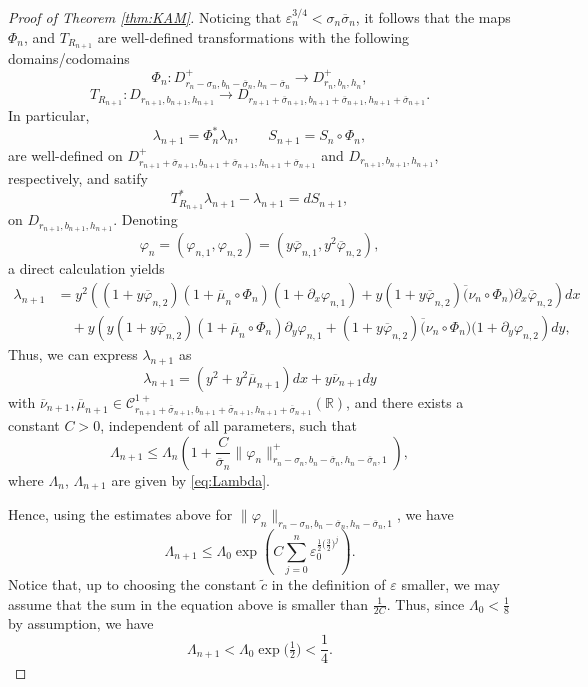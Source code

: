\documentclass[10pt,a4paper]{amsart}
\newcommand{\Domain}[3]{D_{#1, #2, #3}}
\newcommand{\DomainP}[3]{D_{#1, #2, #3}^+}
\newcommand{\R}{\mathbb{R}}
\newcommand{\T}{\mathbb{T}}
\begin{document}
\begin{proof}[Proof of Theorem \ref{thm:KAM}]
Noticing that $\varepsilon_n^{3/4} < \sigma_n \overline \sigma_n$, it follows that the maps $\Phi_n$, and $T_{R_{n + 1}}$ are well-defined transformations with the following domains/codomains
\[ 
\Phi_n: \DomainP{r_n - \sigma_n}{b_n - \overline \sigma_n}{h_n - \overline \sigma_n} \to  \DomainP{r_n}{b_n}{h_n},\]
\[T_{R_{n + 1}}: \Domain{r_{n + 1}}{b_{n + 1}}{h_{n + 1}} \to \Domain{r_{n + 1} + \overline \sigma_{n + 1}}{b_{n + 1} + \overline \sigma_{n + 1}}{h_{n + 1} + \overline \sigma_{n + 1}}.
\]
In particular, 
\[\lambda_{n + 1}= \Phi_n^* \lambda_n,\qquad S_{n + 1}= S_n \circ \Phi_n,\] are well-defined on $\DomainP{r_{n + 1} + \overline \sigma_{n + 1}}{b_{n + 1} + \overline \sigma_{n + 1}}{h_{n + 1} + \overline \sigma_{n + 1}}$ and $\Domain{r_{n + 1}}{b_{n + 1}}{h_{n + 1}}$, respectively, and satify
\[ T_{R_{n + 1}}^* \lambda_{n + 1} - \lambda_{n + 1} = dS_{n + 1}, \]
on $\Domain{r_{n + 1}}{b_{n + 1}}{h_{n + 1}}$. Denoting 
\[\varphi_n =  (\varphi_{n , 1}, \varphi_{n, 2}) = (y \overline \varphi_{n , 1}, y^2 \overline \varphi_{n, 2}),\]
a direct calculation yields
\begin{align*}
    \lambda_{n + 1} & = y^2\left( (1 + y \overline \varphi_{n, 2})(1 + \overline \mu_n \circ \Phi_n)(1 + \partial_x \varphi_{n, 1}) + y(1 + y \overline \varphi_{n, 2})\overline (\nu_n \circ \Phi_n) \partial_x \overline \varphi_{n, 2}\right)dx \\
    & \quad +y\left(y(1 + y \overline \varphi_{n, 2})(1 + \overline \mu_n \circ \Phi_n)\partial_y \varphi_{n, 1} + (1 + y \overline \varphi_{n, 2})\overline (\nu_n \circ \Phi_n) (1 + \partial_y \varphi_{n, 2}\right)dy,
\end{align*}
Thus, we can express $\lambda_{n + 1}$ as 
\[ \lambda_{n + 1} = (y^2 + y^2 \overline \mu_{n + 1}) dx + y \overline \nu_{n + 1} dy\]
with $\overline \nu_{n + 1}, \overline \mu_{n + 1} \in  \mathscr C^{1+}_{r_{n + 1} + \overline \sigma_{n + 1},b_{n + 1} + \overline \sigma_{n + 1},h_{n + 1} + \overline \sigma_{n + 1}}(\R)$, and there exists a constant $C > 0$, independent of all parameters, such that
\[ \Lambda_{n + 1} \leq \Lambda_n\left(1 + \frac{C}{\overline \sigma_n}\|\varphi_{n}\|^+_{r_{n}-\sigma_n,b_{n}-\overline\sigma_n,h_{n}-\overline\sigma_n,1}\right),  \]
where $\Lambda_n$, $\Lambda_{n + 1}$ are given by \eqref{eq:Lambda}. 

Hence, using the estimates above for $\|\varphi_{n}\|_{r_{n}-\sigma_n,b_{n}-\overline\sigma_n,h_{n}-\overline\sigma_n,1}$, we have
\[ \Lambda_{n + 1} \leq \Lambda_0 \exp\left(C \sum_{j = 0}^n \varepsilon_0^{\tfrac{1}{2}\big(\tfrac{3}{2}\big)^j}\right).\]
Notice that, up to choosing the constant $\tilde c$ in the definition of $\varepsilon$ smaller, we may assume that the sum in the equation above is smaller than $\frac{1}{2C}$. Thus, since $\Lambda_0 < \tfrac{1}{8}$ by assumption, we have
\[ \Lambda_{n + 1} < \Lambda_0  \exp\big(\tfrac{1}{2}\big)< \frac{1}{4}.\]


\end{proof}
\end{document}
